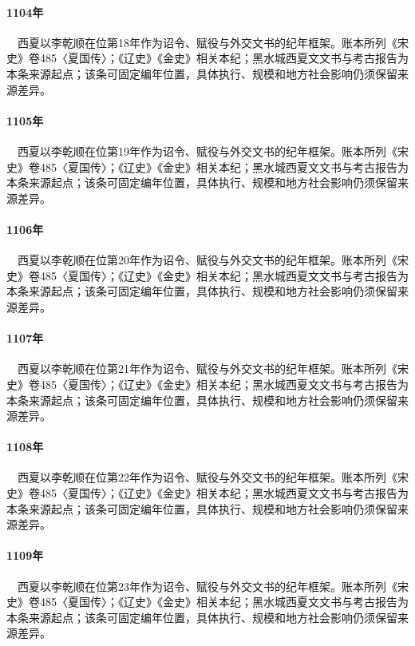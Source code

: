 \paragraph{1104年}　西夏以李乾顺在位第18年作为诏令、赋役与外交文书的纪年框架。账本所列《宋史》卷485〈夏国传〉；《辽史》《金史》相关本纪；黑水城西夏文文书与考古报告为本条来源起点；该条可固定编年位置，具体执行、规模和地方社会影响仍须保留来源差异。

\paragraph{1105年}　西夏以李乾顺在位第19年作为诏令、赋役与外交文书的纪年框架。账本所列《宋史》卷485〈夏国传〉；《辽史》《金史》相关本纪；黑水城西夏文文书与考古报告为本条来源起点；该条可固定编年位置，具体执行、规模和地方社会影响仍须保留来源差异。

\paragraph{1106年}　西夏以李乾顺在位第20年作为诏令、赋役与外交文书的纪年框架。账本所列《宋史》卷485〈夏国传〉；《辽史》《金史》相关本纪；黑水城西夏文文书与考古报告为本条来源起点；该条可固定编年位置，具体执行、规模和地方社会影响仍须保留来源差异。

\paragraph{1107年}　西夏以李乾顺在位第21年作为诏令、赋役与外交文书的纪年框架。账本所列《宋史》卷485〈夏国传〉；《辽史》《金史》相关本纪；黑水城西夏文文书与考古报告为本条来源起点；该条可固定编年位置，具体执行、规模和地方社会影响仍须保留来源差异。

\paragraph{1108年}　西夏以李乾顺在位第22年作为诏令、赋役与外交文书的纪年框架。账本所列《宋史》卷485〈夏国传〉；《辽史》《金史》相关本纪；黑水城西夏文文书与考古报告为本条来源起点；该条可固定编年位置，具体执行、规模和地方社会影响仍须保留来源差异。

\paragraph{1109年}　西夏以李乾顺在位第23年作为诏令、赋役与外交文书的纪年框架。账本所列《宋史》卷485〈夏国传〉；《辽史》《金史》相关本纪；黑水城西夏文文书与考古报告为本条来源起点；该条可固定编年位置，具体执行、规模和地方社会影响仍须保留来源差异。

